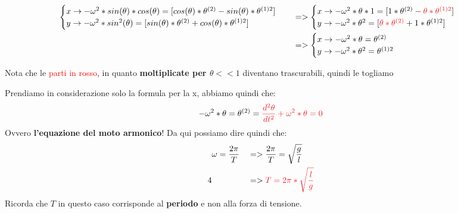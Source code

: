                 \begin{align*}
                    &\begin{cases}
                        x\rightarrow -\omega^2*sin(\theta)*cos(\theta) = [cos(\theta)*\theta^{(2)}-sin(\theta)*\theta^{(1)2}] \\
                        y\rightarrow -\omega^2*sin^2(\theta) = [sin(\theta)*\theta^{(2)}+cos(\theta)*\theta^{(1)2}]
                    \end{cases}
                    &&=>
                    \begin{cases}
                        x\rightarrow -\omega^2*\theta*1 = [1*\theta^{(2)}-\textcolor{Red}{\theta*\theta^{(1)2}}] \\
                        y\rightarrow -\omega^2*\theta^2 = [\textcolor{Red}{\theta*\theta^{(2)}}+1*\theta^{(1)2}]
                    \end{cases}\\
                    & &&=>
                    \begin{cases}
                        x\rightarrow -\omega^2*\theta = \theta^{(2)} \\
                        y\rightarrow -\omega^2*\theta^2 = \theta^{(1)2}
                    \end{cases}
                \end{align*}
                \begin{center}
                    Nota che le \textcolor{Red}{parti in rosso}, in quanto \textbf{moltiplicate per $\theta<<1$} diventano trascurabili, quindi le togliamo
                \end{center}

                Prendiamo in considerazione solo la formula per la x, abbiamo quindi che:
                \begin{align*}
                    -\omega^2*\theta = \theta^{(2)} = \textcolor{Red}{\frac{d^2\theta}{dt^2}+\omega^2*\theta = 0}
                \end{align*}
                Ovvero \textbf{l'equazione del moto armonico}! Da qui possiamo dire quindi che:
                \begin{align*}
                    & \omega = \frac{2\pi}{T} && => \frac{2\pi}{T} = \sqrt{\frac{g}{l}}\\
                4& && => \textcolor{Red}{T = 2\pi*\sqrt{\frac{l}{g}}}\\
                \end{align*}
                Ricorda che $T$ in questo caso corrisponde al \textbf{periodo} e non alla forza di tensione.

